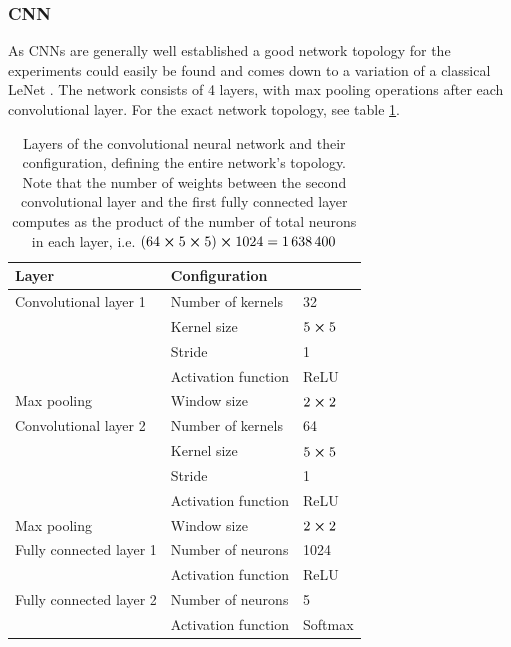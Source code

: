 \subsubsection{CNN}
As CNNs are generally well established a good network topology for the experiments could easily be found and comes down to a variation of a classical LeNet \cite{lecun1998gradient}. The network consists of 4 layers, with max pooling operations after each convolutional layer. For the exact network topology, see table \ref{tab:cnn-config}.
\begin{table}[H]
\centering
\begin{tabular}{@{}lll@{}}
\toprule
Layer                   & \multicolumn{2}{l}{Configuration} \\ \midrule
Convolutional layer 1   & Number of kernels   & 32          \\
                        & Kernel size         & $5\cross 5$ \\
                        & Stride              & 1           \\
                        & Activation function & ReLU        \\
Max pooling             & Window size         & $2\cross 2$ \\
Convolutional layer 2   & Number of kernels   & 64          \\
                        & Kernel size         & $5\cross 5$ \\
                        & Stride              & 1           \\
                        & Activation function & ReLU        \\
Max pooling             & Window size         & $2\cross 2$ \\
Fully connected layer 1 & Number of neurons   & 1024        \\
                        & Activation function & ReLU        \\
Fully connected layer 2 & Number of neurons   & 5           \\
                        & Activation function & Softmax     \\ \bottomrule
\end{tabular}
\caption[Layers of the convolutional neural network]{Layers of the convolutional neural network and their configuration, defining the entire network's topology. Note that the number of weights between the second convolutional layer and the first fully connected layer computes as the product of the number of total neurons in each layer, i.e. $\qty(64\cross 5\cross 5)\cross 1024 = \num{1638400}$}
\label{tab:cnn-config}
\end{table}
